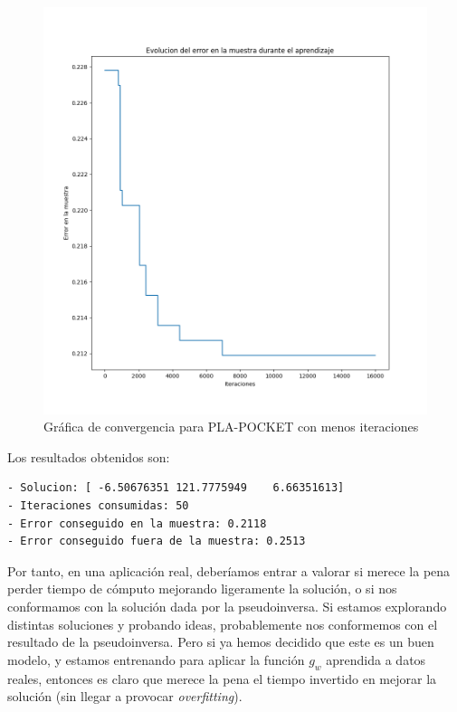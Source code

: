 \documentclass[11pt]{article}
\begin{document}
\begin{figure}[H]
    \centering
    \includegraphics[scale=0.4]{pla_pocket_convergencia_reducida}
    \caption{Gráfica de convergencia para PLA-POCKET con menos iteraciones}
\end{figure}

Los resultados obtenidos son:

\begin{lstlisting}[caption={Salida del entrenamiento de PLA-POCKET}, captionpos=b]
- Solucion: [ -6.50676351 121.7775949    6.66351613]
- Iteraciones consumidas: 50
- Error conseguido en la muestra: 0.2118
- Error conseguido fuera de la muestra: 0.2513
\end{lstlisting}

Por tanto, en una aplicación real, deberíamos entrar a valorar si merece la pena perder tiempo de cómputo mejorando ligeramente la solución, o si nos conformamos con la solución dada por la pseudoinversa. Si estamos explorando distintas soluciones y probando ideas, probablemente nos conformemos con el resultado de la pseudoinversa. Pero si ya hemos decidido que este es un buen modelo, y estamos entrenando para aplicar la función $g_w$ aprendida a datos reales, entonces es claro que merece la pena el tiempo invertido en mejorar la solución (sin llegar a provocar \emph{overfitting}).
\end{document}
